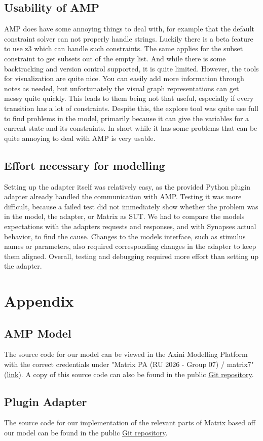 \documentclass[a4paper]{article}
\begin{document}
\subsection{Usability of AMP} \label{usability-of-amp}
AMP does have some annoying things to deal with, for example that the default constraint solver can not properly handle strings. Luckily there is a beta feature to use z3 which can handle such constraints. The same applies for the subset constraint to get subsets out of the empty list. And while there is some backtracking and version control supported, it is quite limited. However, the tools for visualization are quite nice. You can easily add more information through notes as needed, but unfortunately the visual graph representations can get messy quite quickly. This leads to them being not that useful, especially if every transition has a lot of constraints. Despite this, the explore tool was quite use full to find problems in the model, primarily because it can give the variables for a current state and its constraints. In short while it has some problems that can be quite annoying to deal with AMP is very usable.

\subsection{Effort necessary for modelling} \label{effort-necessary-for-modelling}
Setting up the adapter itself was relatively easy, as the provided Python plugin adapter already handled the communication with AMP. Testing it was more difficult, because a failed test did not immediately show whether the problem was in the model, the adapter, or Matrix as SUT. We had to compare the models expectations with the adapters requests and responses, and with Synapses actual behavior, to find the cause. Changes to the models interface, such as stimulus names or parameters, also required corresponding changes in the adapter to keep them aligned. Overall, testing and debugging required more effort than setting up the adapter.

\section{Appendix} \label{appendix}
\subsection{AMP Model} \label{amp-model}
The source code for our model can be viewed in the Axini Modelling Platform with the correct credentials under "Matrix PA (RU 2026 - Group 07) / matrix7" (\href{https://course02.axini.com/test\_sets/dacd5afc-3116-4c2a-aee6-05514b37cde9/model}{link}). A copy of this source code can also be found in the public \href{https://github.com/itsDirk/TestingTechniquesAxini/blob/main/aml/matrix7main.aml}{Git repository}.

\subsection{Plugin Adapter} \label{plugin-adapter}
The source code for our implementation of the relevant parts of Matrix based off our model can be found in the public \href{https://github.com/itsDirk/TestingTechniquesAxini/tree/main/smartdoor-adapter-python/src/adapter/matrix}{Git repository}.
\end{document}
